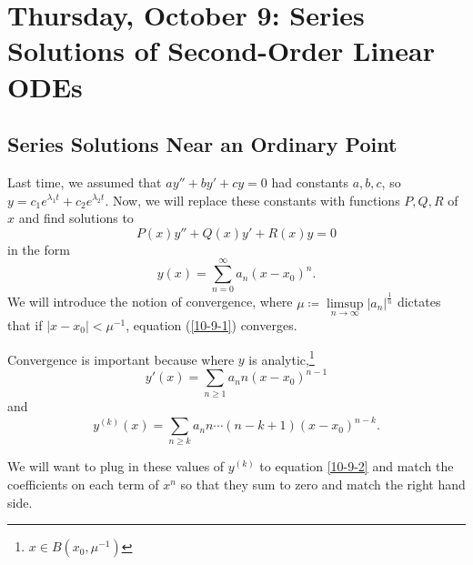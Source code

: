 \documentclass{tufte-handout}
\theoremstyle{definition}
\begin{document}
\section{Thursday, October 9: Series Solutions of Second-Order Linear ODEs}
\subsection{Series Solutions Near an Ordinary Point}

Last time, we assumed that $ay'' + by' + cy = 0$ had constants $a,b,c$, so $y = c_1e^{\lambda_1 t} + c_2e^{\lambda_2 t}$. Now, we will replace these constants with functions $P, Q, R$ of $x$ and find solutions to
\begin{equation}
	P(x) y'' + Q(x)y' + R(x)y = 0 \label{10-9-2}
\end{equation}
in the form \begin{equation}
	y(x) = \sum\limits_{n=0}^{\infty} a_n (x-x_0)^{n} \label{10-9-1}
.\end{equation} We will introduce the notion of convergence, where $\mu \coloneqq \limsup\limits_{n \to \infty} \left| a_n \right|^{\frac{1}{n}}$ dictates that if $\left| x-x_0 \right| < \mu^{-1}$, equation (\ref{10-9-1}) converges.

Convergence is important because where $y$ is analytic,\footnote{$x \in B(x_0, \mu^{-1})$} \[
	y'(x) = \sum\limits_{n \ge 1} a_n n \left( x-x_0 \right)^{n-1}
\] and \[
	y^{(k)}(x) = \sum\limits_{n \ge k}^{} a_n n \cdots \left( n-k+1 \right) \left( x-x_0 \right)^{n-k}
.\] 

We will want to plug in these values of $y^{(k)}$ to equation \ref{10-9-2} and match the coefficients on each term of $x^n$ so that they sum to zero and match the right hand side.
\end{document}
